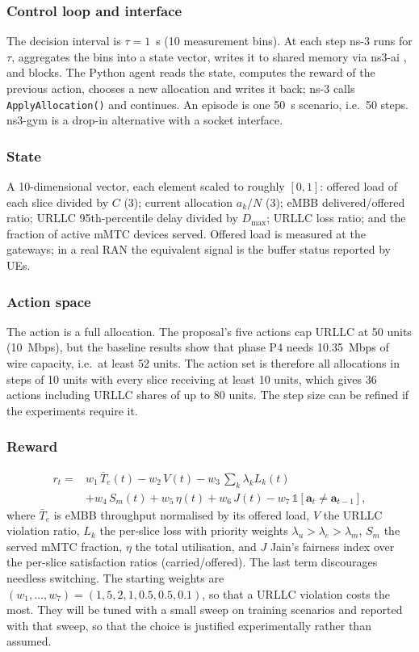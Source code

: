 \documentclass[conference]{IEEEtran}
\begin{document}
\subsubsection{Control loop and interface}
The decision interval is $\tau=1$~s (10 measurement bins). At each step ns-3 runs for $\tau$, aggregates the bins into a state vector, writes it to shared memory via ns3-ai \cite{ns3ai}, and blocks. The Python agent reads the state, computes the reward of the previous action, chooses a new allocation and writes it back; ns-3 calls \texttt{ApplyAllocation()} and continues. An episode is one 50~s scenario, i.e.\ 50 steps. ns3-gym \cite{ns3gym} is a drop-in alternative with a socket interface.

\subsubsection{State}
A 10-dimensional vector, each element scaled to roughly $[0,1]$: offered load of each slice divided by $C$ (3); current allocation $a_k/N$ (3); eMBB delivered/offered ratio; URLLC 95th-percentile delay divided by $D_{\max}$; URLLC loss ratio; and the fraction of active mMTC devices served. Offered load is measured at the gateways; in a real RAN the equivalent signal is the buffer status reported by UEs.

\subsubsection{Action space}
The action is a full allocation. The proposal's five actions cap URLLC at 50 units (10~Mbps), but the baseline results show that phase P4 needs 10.35~Mbps of wire capacity, i.e.\ at least 52 units. The action set is therefore all allocations in steps of 10 units with every slice receiving at least 10 units, which gives 36 actions including URLLC shares of up to 80 units. The step size can be refined if the experiments require it.

\subsubsection{Reward}
\begin{equation}
\begin{split}
r_t ={}& w_1\,\bar T_e(t) - w_2\,V(t) - w_3\,\textstyle\sum_k \lambda_k L_k(t)\\
&+ w_4\,S_m(t) + w_5\,\eta(t) + w_6\,J(t) - w_7\,\mathbb{1}[\mathbf{a}_t\neq\mathbf{a}_{t-1}],
\end{split}
\end{equation}
where $\bar T_e$ is eMBB throughput normalised by its offered load, $V$ the URLLC violation ratio, $L_k$ the per-slice loss with priority weights $\lambda_u>\lambda_e>\lambda_m$, $S_m$ the served mMTC fraction, $\eta$ the total utilisation, and $J$ Jain's fairness index \cite{jain1984} over the per-slice satisfaction ratios (carried/offered). The last term discourages needless switching. The starting weights are $(w_1,\dots,w_7)=(1,5,2,1,0.5,0.5,0.1)$, so that a URLLC violation costs the most. They will be tuned with a small sweep on training scenarios and reported with that sweep, so that the choice is justified experimentally rather than assumed.
\end{document}
